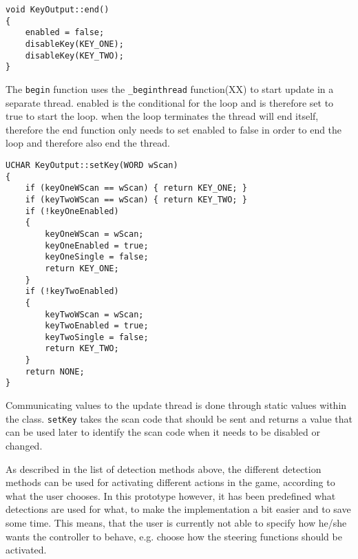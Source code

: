 \begin{lstlisting}[caption=KeyOutput end thread function, label=lst:lst13]
void KeyOutput::end() 
{
    enabled = false;
    disableKey(KEY_ONE);
    disableKey(KEY_TWO);
}
\end{lstlisting}

The \texttt{begin} function uses the \texttt{\_beginthread} function(XX) to
start update in a separate thread. enabled is the conditional for the loop and
is therefore set to true to start the loop. when the loop terminates the thread
will end itself, therefore the end function only needs to set enabled to false
in order to end the loop and therefore also end the thread.

\begin{lstlisting}[caption=KeyOutput setKey function, label=lst:lst14]
UCHAR KeyOutput::setKey(WORD wScan) 
{ 
    if (keyOneWScan == wScan) { return KEY_ONE; } 
    if (keyTwoWScan == wScan) { return KEY_TWO; }
    if (!keyOneEnabled) 
    { 
        keyOneWScan = wScan;
        keyOneEnabled = true;
        keyOneSingle = false;
        return KEY_ONE; 
    } 
    if (!keyTwoEnabled) 
    { 
        keyTwoWScan = wScan; 
        keyTwoEnabled = true; 
        keyTwoSingle = false; 
        return KEY_TWO; 
    } 
    return NONE;  
}
\end{lstlisting}

Communicating values to the update thread is done through static values within the class. 
\texttt{setKey} takes the scan code that should be sent and returns a value that can be used later to identify the scan code when it needs to be disabled or changed.
\bigskip

As described in the list of detection methods above, the different detection methods can be used for activating different actions in the game, according to what the user chooses. 
In this prototype however, it has been predefined what detections are used for what, to make the implementation a bit easier and to save some time. 
This means, that the user is currently not able to specify how he/she wants the controller to behave, e.g. choose how the steering functions should be activated.